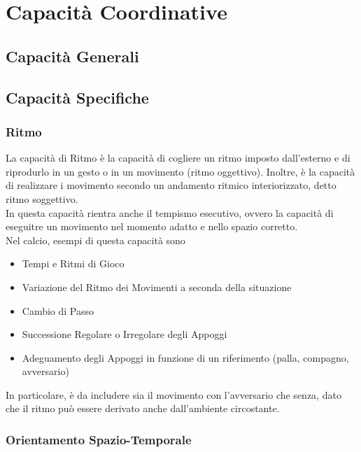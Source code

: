 \documentclass[../uefaC.tex]{subfiles}
\begin{document}
\section{Capacità Coordinative}

\subsection{Capacità Generali}

\subsection{Capacità Specifiche}

\subsubsection{Ritmo}

La capacità di Ritmo è la capacità di cogliere un ritmo imposto dall'esterno e di riprodurlo in un gesto o in un movimento (ritmo oggettivo). Inoltre, è la capacità di realizzare i movimento secondo un andamento ritmico interiorizzato, detto ritmo soggettivo. \hfill \\
In questa capacità rientra anche il tempismo esecutivo, ovvero la capacità di eseguitre un movimento nel momento adatto e nello spazio corretto. \hfill \\
Nel calcio, esempi di questa capacità sono
\begin{itemize}
    \item Tempi e Ritmi di Gioco
    \item Variazione del Ritmo dei Movimenti a seconda della situazione
    \item Cambio di Passo
    \item Successione Regolare o Irregolare degli Appoggi
    \item Adeguamento degli Appoggi in funzione di un riferimento (palla, compagno, avversario)
\end{itemize}
In particolare, è da includere sia il movimento con l'avversario che senza, dato che il ritmo può essere derivato anche dall'ambiente circostante.

\subsubsection{Orientamento Spazio-Temporale}
\end{document}
